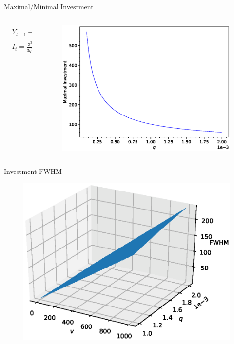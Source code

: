 \documentclass{beamer}
\begin{document}
\begin{frame}{Maximal/Minimal Investment}
	\begin{columns}
	\begin{column}{0.5\textwidth}
		\begin{align*}
			&Y_{t-1}-Y_{t-2} = \pm\frac{q^{1/4}v}{3^{1/4}}\\
			&I_t = \frac{3^{3/4}}{3q^{3/4}}
		\end{align*}
	\end{column}
	\begin{column}{0.5\textwidth}
		\begin{figure}
			\centering
			\includegraphics[width=1.2\textwidth]{maxinvestment.eps}
		\end{figure}
	\end{column}
	\end{columns}
\end{frame}

\begin{frame}{Investment FWHM}
	\begin{figure}
		\centering
		\includegraphics[height=0.9\textheight]{widthinvestment.eps}
	\end{figure}
\end{frame}
\end{document}
